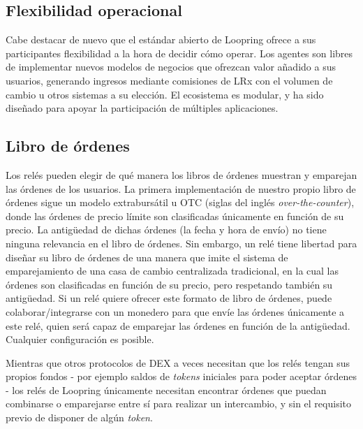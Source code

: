 \documentclass[UTF8,nofonts]{article}
\begin{document}
\begin{multicols}{2}
\section{Flexibilidad operacional\label{sec:business_model}}
Cabe destacar de nuevo que el estándar abierto de Loopring ofrece a sus participantes flexibilidad a la hora de decidir cómo operar. Los agentes son libres de implementar nuevos modelos de negocios que ofrezcan valor añadido a sus usuarios, generando ingresos mediante comisiones de LRx con el volumen de cambio u otros sistemas a su elección. El ecosistema es modular, y ha sido diseñado para apoyar la participación de múltiples aplicaciones.


\subsection{Libro de órdenes\label{sec:order_book}}
Los relés pueden elegir de qué manera los libros de órdenes muestran y emparejan las órdenes de los usuarios. La primera implementación de nuestro propio libro de órdenes sigue un modelo extrabursátil u OTC (siglas del inglés  \textit{over-the-counter}), donde las órdenes de precio límite son clasificadas únicamente en función de su precio. La antigüedad de dichas órdenes (la fecha y hora de envío) no tiene ninguna relevancia en el libro de órdenes. Sin embargo, un relé tiene libertad para diseñar su libro de órdenes de una manera que imite el sistema de emparejamiento de una casa de cambio centralizada tradicional, en la cual las órdenes son clasificadas en función de su precio, pero respetando también su antigüedad.  Si un relé quiere ofrecer este formato de libro de órdenes, puede colaborar/integrarse con un monedero para que envíe las órdenes únicamente a este relé, quien será capaz de emparejar las órdenes en función de la antigüedad. Cualquier configuración es posible.

Mientras que otros protocolos de DEX a veces necesitan que los relés tengan sus propios fondos - por ejemplo saldos de \textit{tokens} iniciales para poder aceptar órdenes - los relés de Loopring únicamente necesitan encontrar órdenes que puedan combinarse o emparejarse entre sí para realizar un intercambio, y sin el requisito previo de disponer de algún \textit{token}.


\end{multicols}
\end{document}

